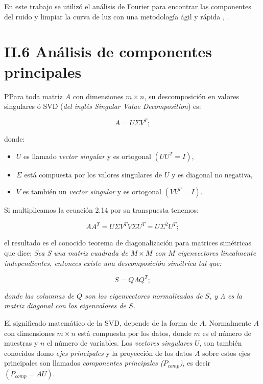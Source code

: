 En este trabajo se utilizó el análisis de Fourier para encontrar las componentes del ruido y limpiar la curva de luz con una metodología ágil y rápida \cite{kosarev1983optimal}, \cite{brault1971analysis}. 

\section*{II.6 Análisis de componentes principales}

PPara toda matriz $A$ con dimensiones $m\times n$, su descomposición en valores singulares ó SVD (\textit{del inglés Singular Value Decomposition}) es:

\begin{equation}
  \displaystyle A=U\Sigma V^{T};
\end{equation}

\noindent donde:\\

\begin{itemize}
  \item $U$ es llamado \textit{vector singular} y es ortogonal $(UU^{T}=I)$,
  \item $\Sigma$ está compuesta por los valores singulares de $U$ y es diagonal no negativa,
  \item $V$ es también un \textit{vector singular} y es ortogonal $(VV^{T}=I)$.
\end{itemize}

Si multiplicamos la ecuación 2.14 por su transpuesta tenemos:

\begin{equation}
  \displaystyle AA^{T}=U\Sigma V^{T} V\Sigma U^{T} = U \Sigma^{2} U^{T};
\end{equation}

\noindent el resultado es el conocido teorema de diagonalización para matrices simétricas que dice: \textit{Sea S una matriz cuadrada de $M\times M$ con $M$ eigenvectores linealmente independientes, entonces existe una descomposición simétrica tal que:}

\begin{equation*}
  \displaystyle S=Q\Lambda Q^{T};
\end{equation*}


\noindent \textit{donde las columnas de $Q$ son los eigenvectores normalizados de $S$, y $\Lambda$ es la matriz diagonal con los eigenvalores de $S$.}

El significado matemático de la SVD, depende de la forma de $A$. Normalmente $A$ con dimensiones $m\times n$ está compuesta por los datos, donde $m$ es el número de muestras y $n$ el número de variables. Los \textit{vectores singulares} $U$, son también conocidos domo \textit{ejes principales} y la proyección de los datos $A$ sobre estos ejes principales son llamados \textit{componentes principales ($P_{comp}$)}, es decir $(P_{comp}=AU)$.

